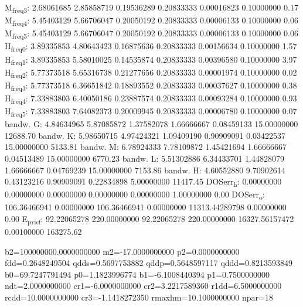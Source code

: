 \documentclass[11pt]{article}
\begin{document}
M\textsubscript{freq}\textsubscript{3}:   2.68061685   2.85858719   0.19536289   0.20833333   0.00016823   0.10000000         0.17
M\textsubscript{freq}\textsubscript{4}:   5.45403129   5.66706047   0.20050192   0.20833333   0.00006133   0.10000000         0.06
M\textsubscript{freq}\textsubscript{5}:   5.45403129   5.66706047   0.20050192   0.20833333   0.00006133   0.10000000         0.06
H\textsubscript{freq}\textsubscript{0}:   3.89335853   4.80643423   0.16875636   0.20833333   0.00156634   0.10000000         1.57
H\textsubscript{freq}\textsubscript{1}:   3.89335853   5.58010025   0.14535874   0.20833333   0.00396580   0.10000000         3.97
H\textsubscript{freq}\textsubscript{2}:   5.77373518   5.65316738   0.21277656   0.20833333   0.00001974   0.10000000         0.02
H\textsubscript{freq}\textsubscript{3}:   5.77373518   6.36651842   0.18893552   0.20833333   0.00037627   0.10000000         0.38
H\textsubscript{freq}\textsubscript{4}:   7.33883803   6.40050186   0.23887574   0.20833333   0.00093284   0.10000000         0.93
H\textsubscript{freq}\textsubscript{5}:   7.33883803   7.64082373   0.20009945   0.20833333   0.00006780   0.10000000         0.07
bandw. G:   4.84634965   5.87085872   1.37582078   1.66666667   0.08459133  15.00000000     12688.70
bandw. K:   5.98650715   4.97424321   1.09409190   0.90909091   0.03422537  15.00000000      5133.81
bandw. M:   6.78924333   7.78109872   1.45421694   1.66666667   0.04513489  15.00000000      6770.23
bandw. L:   5.51302886   6.34433701   1.44828079   1.66666667   0.04769239  15.00000000      7153.86
bandw. H:   4.60552880   9.70902614   0.43123216   0.90909091   0.22834898   5.00000000     11417.45
DOSerr\textsubscript{h}:   0.00000000   0.00000000   0.00000000   0.00000000   0.00000000   1.00000000         0.00
DOSerr\textsubscript{o}: 106.36466941   0.00000000 106.36466941   0.00000000 11313.44289798   0.00000000         0.00
E\textsubscript{pris}\textsubscript{f}:  92.22065278 220.00000000  92.22065278 220.00000000 16327.56157472   0.00100000    163275.62

b2=100000000.0000000000 m2=-17.0000000000 p2=0.0000000000 fdd=0.2648249504 qdds=0.5697753882 qddp=0.5648597117 qddd=0.8213593849 b0=69.7247791494 p0=1.1823996774 b1=-6.1008440394 p1=0.7500000000 ndt=2.0000000000 cr1=-6.0000000000 cr2=3.2217589360 r1dd=6.5000000000 rcdd=10.0000000000 cr3=-1.1418272350 rmaxhm=10.1000000000 npar=18 
\end{document}
